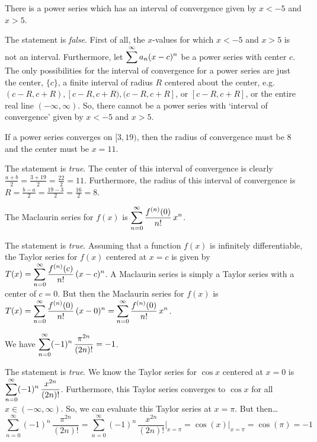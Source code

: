 \documentclass[11pt,letterpaper]{article}
\begin{document}
 There is a power series which has an interval of convergence given by $x < -5$ and $x > 5$. \pspace

\sol The statement is \textit{false}. First of all, the $x$-values for which $x < -5$ and $x > 5$ is not an interval. Furthermore, let $\displaystyle\sum^\infty a_n (x - c)^n$ be a power series with center $c$. The only possibilities for the interval of convergence for a power series are just the center, $\{ c \}$, a finite interval of radius $R$ centered about the center, e.g. $(c - R, c + R), [c - R, c + R), (c - R, c + R]$, or $[c - R, c + R]$, or the entire real line $(-\infty, \infty)$. So, there cannot be a power series with `interval of convergence' given by $x < -5$ and $x > 5$. \pvspace{1.3cm}



 If a power series converges on $[3,19)$, then the radius of convergence must be $8$ and the center must be $x= 11$. \pspace

\sol The statement is \textit{true}. The center of this interval of convergence is clearly $\frac{a + b}{2}= \frac{3 + 19}{2}= \frac{22}{2}= 11$. Furthermore, the radius of this interval of convergence is $R= \frac{b - a}{2}= \frac{19 - 3}{2}= \frac{16}{2}= 8$. \pvspace{1.3cm}



 The Maclaurin series for $f(x)$ is $\displaystyle\sum_{n=0}^\infty \dfrac{f^{(n)}(0)}{n!} \, x^n$. \pspace

\sol The statement is \textit{true}. Assuming that a function $f(x)$ is infinitely differentiable, the Taylor series for $f(x)$ centered at $x= c$ is given by $\displaystyle T(x)= \sum_{n=0}^\infty \dfrac{f^{(n)}(c)}{n!} \, (x - c)^n$. A Maclaurin series is simply a Taylor series with a center of $c= 0$. But then the Maclaurin series for $f(x)$ is $\displaystyle T(x)= \sum_{n=0}^\infty \dfrac{f^{(n)}(0)}{n!} \, (x - 0)^n= \sum_{n=0}^\infty \dfrac{f^{(n)}(0)}{n!} \, x^n$. \pvspace{1.3cm}



 We have $\displaystyle\sum_{n=0}^\infty (-1)^n \,\dfrac{\pi^{2n}}{(2n)!}= -1$. \pspace

\sol The statement is \textit{true}. We know the Taylor series for $\cos x$ centered at $x= 0$ is $\displaystyle\sum_{n=0}^\infty (-1)^n \, \dfrac{x^{2n}}{(2n)!}$. Furthermore, this Taylor series converges to $\cos x$ for all $x \in (-\infty, \infty)$. So, we can evaluate this Taylor series at $x= \pi$. But then\dots
	\[
	\sum_{n=0}^\infty (-1)^n \,\dfrac{\pi^{2n}}{(2n)!}= \sum_{n=0}^\infty (-1)^n \, \dfrac{x^{2n}}{(2n)!} \bigg|_{x= \pi}= \cos(x) \bigg|_{x= \pi}= \cos(\pi)= -1
	\] \pvspace{1.3cm}
\end{document}
